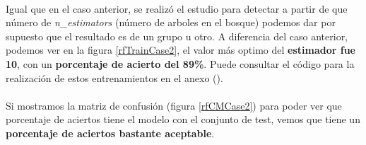 \paragraph{}
Igual que en el caso anterior, se realizó el estudio para detectar a partir de que número de \textit{n\_estimators}\cite{ref:rf_random_forest_classifier} (número de arboles en el bosque) podemos dar por supuesto que el resultado es de un grupo u otro. A diferencia del caso anterior, podemos ver en la figura \ref{rfTrainCase2}, el valor más optimo del \textbf{estimador fue 10}, con un \textbf{porcentaje de acierto del 89\%}. Puede consultar el código para la realización de estos entrenamientos en el anexo ().

\paragraph{}
Si mostramos la matriz de confusión\cite{ref:confusion_matrix} (figura \ref{rfCMCase2}) para poder ver que porcentaje de aciertos tiene el modelo con el conjunto de test, vemos que tiene un \textbf{porcentaje de aciertos bastante aceptable}.

